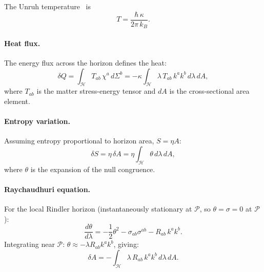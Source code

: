 \documentclass[11pt]{article}
\begin{document}
The Unruh temperature~\citep{Unruh1976} is
\begin{equation}
T = \frac{\hbar\,\kappa}{2\pi\,k_B}.
\label{eq:unruh}
\end{equation}

\paragraph{Heat flux.}
The energy flux across the horizon defines the heat:
\begin{equation}
\delta Q = \int_{\mathcal{H}} T_{ab}\,\chi^a\,d\Sigma^b
= -\kappa \int_{\mathcal{H}} \lambda\,T_{ab}\,k^a k^b\,d\lambda\,dA,
\label{eq:heat_flux}
\end{equation}
where $T_{ab}$ is the matter stress-energy tensor and $dA$ is the
cross-sectional area element.

\paragraph{Entropy variation.}
Assuming entropy proportional to horizon area, $S = \eta A$:
\begin{equation}
\delta S = \eta\,\delta A = \eta \int_{\mathcal{H}} \theta\,d\lambda\,dA,
\label{eq:dS_jacobson}
\end{equation}
where $\theta$ is the expansion of the null congruence.

\paragraph{Raychaudhuri equation.}
For the local Rindler horizon (instantaneously stationary at $\mathcal{P}$,
so $\theta = \sigma = 0$ at $\mathcal{P}$):
\begin{equation}
\frac{d\theta}{d\lambda} = -\frac{1}{2}\theta^2
  - \sigma_{ab}\sigma^{ab} - R_{ab}\,k^a k^b.
\label{eq:raychaudhuri}
\end{equation}
Integrating near $\mathcal{P}$: $\theta \approx -\lambda R_{ab}k^a k^b$,
giving:
\begin{equation}
\delta A = -\int_{\mathcal{H}} \lambda\,R_{ab}\,k^a k^b\,d\lambda\,dA.
\label{eq:dA}
\end{equation}
\end{document}
